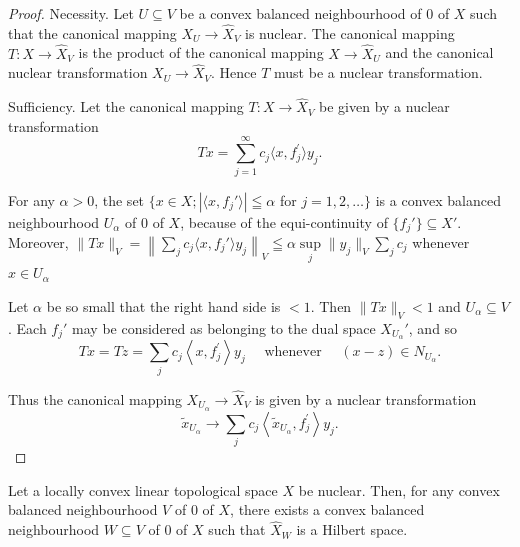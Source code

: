 \begin{proof}
 Necessity. Let $U \subseteq V$ be a convex balanced neighbourhood of $0$ of $X$ such that the canonical mapping $X_{U} \to \hat{X}_{V}$ is nuclear. The canonical mapping $T: X \to \hat{X}_{V}$ is the product of the canonical mapping $X \to \hat{X}_{U}$ and the canonical nuclear transformation $X_{U} \to \hat{X}_{V}$. Hence $T$ must be a nuclear transformation. 

Sufficiency. Let the canonical mapping $T: X \to \hat{X}_{V}$ be given by a nuclear transformation 
\[
T x = \sum\limits_{j=1} ^{\infty} c _{j} \langle x, f _{j} ^{\prime} \rangle y _{j}.
\]

For any $\alpha > 0$, the set $\{x \in X; |\langle x, f_j' \rangle| \leqq \alpha$ for $j = 1, 2, \ldots\}$ is a convex balanced neighbourhood $U_{\alpha}$ of $0$ of $X$, because of the equi-continuity of $\{f_j'\} \subseteq X'$. Moreover, 
$\| Tx\| _V = \left\| \sum\limits_{j}c_j\langle x,f_j'\rangle y_j\right\| _V\leqq \alpha \sup\limits_{j}\| y_j\| _V\sum\limits_{j}c_j$ whenever $x\in U_{\alpha}$ 

Let $\alpha$ be so small that the right hand side is $< 1$. Then $\|Tx\|_V < 1$ and $U_{\alpha} \subseteq V$. Each $f_j'$ may be considered as belonging to the dual space $X_{U_{\alpha}}'$, and so 
\[
T x = T z = \sum\limits_{j} c _{j} \left\langle x, f _{j} ^{\prime} \right\rangle y _{j} \quad \text{ whenever } \quad (x - z) \in N _ {U _{\alpha}}.
\]

Thus the canonical mapping $X_{U_{\alpha}} \to \hat{X}_V$ is given by a nuclear transformation 
\[
\tilde {x} _ {U _{\alpha}} \rightarrow \sum\limits_{j} c _{j} \left\langle \tilde {x} _ {U _{\alpha}}, f _{j} ^{\prime} \right\rangle y _{j}.
\]
\end{proof}

\begin{theorem}\label{thm:AX.0.Theorem.2} Let a locally convex linear topological space $X$ be nuclear. Then, for any convex balanced neighbourhood $V$ of $0$ of $X$, there exists a convex balanced neighbourhood $W \subseteq V$ of $0$ of $X$ such that $\hat{X}_{W}$ is a Hilbert space. 
\end{theorem}

